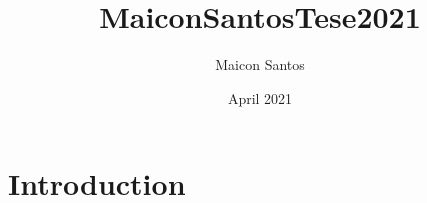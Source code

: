 \documentclass{article}
\title{MaiconSantosTese2021}
\author{Maicon Santos}
\date{April 2021}
\begin{document}
\maketitle

\section{Introduction}
\end{document}
